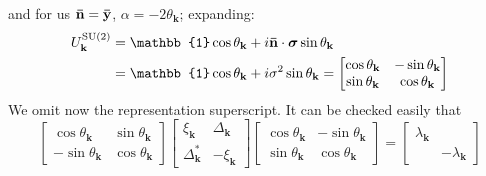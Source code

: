 and for us $\mathbf{\bar{n}} = \mathbf{\bar{y}}$, $\alpha = -2\theta_\mathbf{k}$; expanding:
\[
\begin{aligned}
	U_\mathbf{k}^{\mathrm{SU}(2)} &= \mathbb{1} \cos \theta_\mathbf{k} + i \versor{n} \cdot \bm{\sigma} \sin \theta_\mathbf{k}\\
	&= \mathbb{1} \cos \theta_\mathbf{k} + i \sigma^2 \sin \theta_\mathbf{k} = \begin{bmatrix}
		\cos \theta_\mathbf{k} & -\sin \theta_\mathbf{k} \\
		\sin \theta_\mathbf{k} & \cos \theta_\mathbf{k}
	\end{bmatrix}
\end{aligned}
\]
We omit now the representation superscript. It can be checked easily that
\[
	\begin{bmatrix}
		\cos \theta_\mathbf{k} & \sin \theta_\mathbf{k} \\
		- \sin \theta_\mathbf{k} & \cos \theta_\mathbf{k}
	\end{bmatrix} 
	\begin{bmatrix}
		\xi_\mathbf{k} & \Delta_\mathbf{k} \\
		\Delta_\mathbf{k}^* & - \xi_\mathbf{k}
	\end{bmatrix}
	\begin{bmatrix}
		\cos \theta_\mathbf{k} & -\sin \theta_\mathbf{k} \\
		\sin \theta_\mathbf{k} & \cos \theta_\mathbf{k}
	\end{bmatrix} =
	\begin{bmatrix}
		\lambda_\mathbf{k} & \\
		& -\lambda_\mathbf{k}
	\end{bmatrix}
\]

